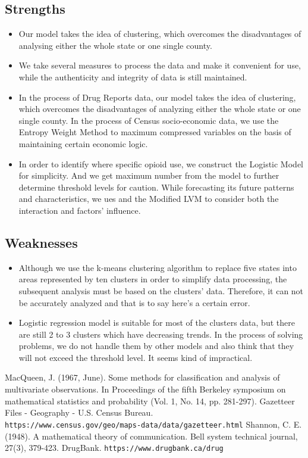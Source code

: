 \documentclass[12pt]{article}
\begin{document}
\subsection{Strengths}
\begin{itemize}
    \item Our model takes the idea of clustering, which overcomes the disadvantages of analysing either the whole state or one single county.
    \item We take several measures to process the data and make it convenient for use, while the authenticity and integrity of data is still maintained.
    \item In the process of Drug Reports data, our model takes the idea of clustering, which overcomes the disadvantages of analyzing either the whole state or one single county. In the process of Census socio-economic data, we use the Entropy Weight Method to maximum compressed variables on the basis of maintaining certain economic logic.
	\item In order to identify where specific opioid use, we construct the Logistic Model for simplicity. And we get maximum number from the model to further determine threshold levels for caution. While forecasting its future patterns and characteristics, we ues and the Modified LVM to consider both the interaction and factors’ influence.
\end{itemize}

\subsection{Weaknesses}
\begin{itemize}
	\item Although we use the k-means clustering algorithm to replace five states into areas represented by ten clusters in order to simplify data processing, the subsequent analysis must be based on the clusters’ data. Therefore, it can not be accurately analyzed and that is to say here’s a certain error.
	\item Logistic regression model is suitable for most of the clusters data, but there are still 2 to 3 clusters which have decreasing trends. In the process of solving problems, we do not handle them by other models and also think that they will not exceed the threshold level. It seems kind of impractical.
 \end{itemize}

\begin{thebibliography}{99}
MacQueen, J. (1967, June). Some methods for classification and analysis of multivariate observations. In Proceedings of the fifth Berkeley symposium on mathematical statistics and probability (Vol. 1, No. 14, pp. 281-297).
Gazetteer Files - Geography - U.S. Census Bureau. \texttt{\\https://www.census.gov/geo/maps-data/data/gazetteer.html}
Shannon, C. E. (1948). A mathematical theory of communication. Bell system technical journal, 27(3), 379-423.
DrugBank. \texttt{https://www.drugbank.ca/drug}
\end{thebibliography}
\end{document}
